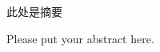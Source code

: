 
\begin{cabstract}
此处是摘要
\end{cabstract}


\begin{eabstract}
Please put your abstract here.
\end{eabstract}

\clearpage
